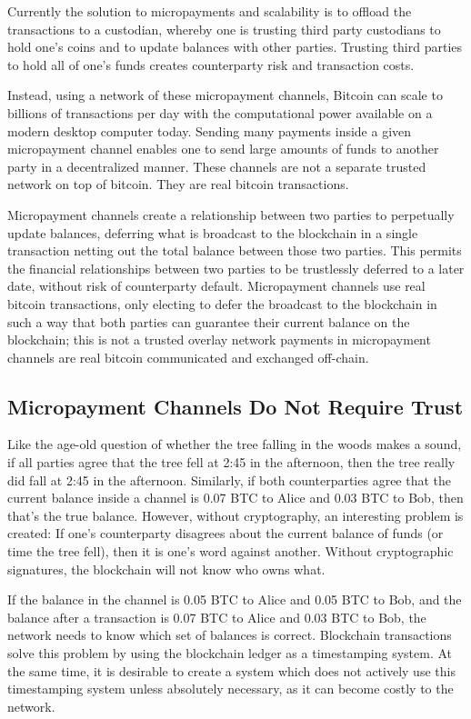 \documentclass[letterpaper,11pt]{article}
\begin{document}
Currently the solution to micropayments and scalability is to offload the
transactions to a custodian, whereby one is trusting third party custodians to
hold one's coins and to update balances with other parties. Trusting third
parties to hold all of one's funds creates counterparty risk and transaction
costs.

Instead, using a network of these micropayment channels, Bitcoin can scale to
billions of transactions per day with the computational power available on a
modern desktop computer today. Sending many payments inside a given
micropayment channel enables one to send large amounts of funds to another
party in a decentralized manner. These channels are not a separate trusted
network on top of bitcoin. They are real bitcoin transactions.

Micropayment channels\cite{wikicontracts}\cite{bitcoinjmicropay} create a
relationship between two parties to perpetually update balances, deferring what
is broadcast to the blockchain in a single transaction netting out the total
balance between those two parties. This permits the financial relationships
between two parties to be trustlessly deferred to a later date, without risk of
counterparty default. Micropayment channels use real bitcoin transactions, only
electing to defer the broadcast to the blockchain in such a way that both
parties can guarantee their current balance on the blockchain; this is not a
trusted overlay network \textemdash payments in micropayment channels are real
bitcoin communicated and exchanged off-chain.

\subsection{Micropayment Channels Do Not Require Trust}

Like the age-old question of whether the tree falling in the woods makes a
sound, if all parties agree that the tree fell at 2:45 in the afternoon, then
the tree really did fall at 2:45 in the afternoon. Similarly, if both
counterparties agree that the current balance inside a channel is 0.07 BTC to
Alice and 0.03 BTC to Bob, then that's the true balance. However, without
cryptography, an interesting problem is created: If one's counterparty
disagrees about the current balance of funds (or time the tree fell), then it
is one's word against another. Without cryptographic signatures, the blockchain
will not know who owns what. 

If the balance in the channel is 0.05 BTC to Alice and 0.05 BTC to Bob, and the
balance after a transaction is 0.07 BTC to Alice and 0.03 BTC to Bob, the
network needs to know which set of balances is correct. Blockchain transactions
solve this problem by using the blockchain ledger as a timestamping system. At
the same time, it is desirable to create a system which does not actively use
this timestamping system unless absolutely necessary, as it can become costly to
the network.
\end{document}
